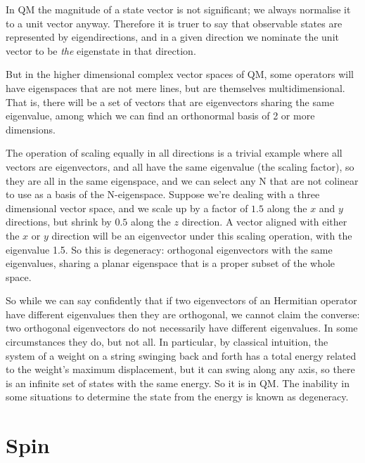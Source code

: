 In QM the magnitude of a state vector is not significant; we always normalise it to a unit vector anyway. Therefore it is truer to say that observable states are represented by eigendirections, and in a given direction we nominate the unit vector to be \textit{the} eigenstate in that direction.

But in the higher dimensional complex vector spaces of QM, some operators will have eigenspaces that are not mere lines, but are themselves multidimensional. That is, there will be a set of vectors that are eigenvectors sharing the same eigenvalue, among which we can find an orthonormal basis of 2 or more dimensions.

The operation of scaling equally in all directions is a trivial example where all vectors are eigenvectors, and all have the same eigenvalue (the scaling factor), so they are all in the same eigenspace, and we can select any N that are not colinear to use as a basis of the N-eigenspace. Suppose we're dealing with a three dimensional vector space, and we scale up by a factor of $1.5$ along the $x$ and $y$ directions, but shrink by $0.5$ along the $z$ direction. A vector aligned with either the $x$ or $y$ direction will be an eigenvector under this scaling operation, with the eigenvalue 1.5. So this is degeneracy: orthogonal eigenvectors with the same eigenvalues, sharing a planar eigenspace that is a proper subset of the whole space.

So while we can say confidently that if two eigenvectors of an Hermitian operator have different eigenvalues then they are orthogonal, we cannot claim the converse: two orthogonal eigenvectors do not necessarily have different eigenvalues. In some circumstances they do, but not all. In particular, by classical intuition, the system of a weight on a string swinging back and forth has a total energy related to the weight's maximum displacement, but it can swing along any axis, so there is an infinite set of states with the same energy. So it is in QM. The inability in some situations to determine the state from the energy is known as degeneracy.

\section{Spin}

